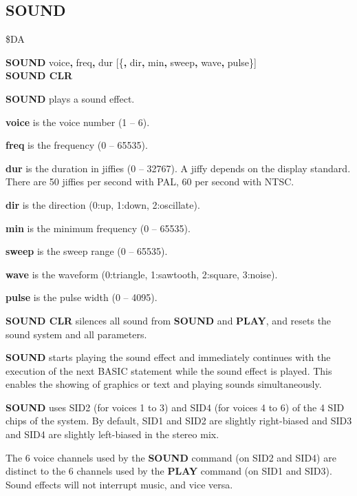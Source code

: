\subsection{SOUND}
\begin{description}[leftmargin=2cm,style=nextline]
\item [Token:]    \$DA

\item [Format:]   {\bf SOUND} voice{\bf,} freq{\bf,} dur [\{{\bf,} dir{\bf,} min{\bf,} sweep{\bf,} wave{\bf,} pulse\}] \\
                  {\bf SOUND CLR}

\item [Usage:]    {\bf SOUND} plays a sound effect.

                  {\bf voice} is the voice number (1 -- 6).

                  {\bf freq} is the frequency (0 -- 65535).

                  {\bf dur} is the duration in jiffies (0 -- 32767). A jiffy depends on the display standard. There are 50 jiffies per second with PAL, 60 per second with NTSC.

                  {\bf dir} is the direction (0:up, 1:down, 2:oscillate).

                  {\bf min} is the minimum frequency (0 -- 65535).

                  {\bf sweep} is the sweep range (0 -- 65535).

                  {\bf wave} is the waveform (0:triangle, 1:sawtooth, 2:square, 3:noise).

                  {\bf pulse} is the pulse width (0 -- 4095).

                  {\bf SOUND CLR} silences all sound from {\bf SOUND} and {\bf PLAY}, and resets the sound system and all parameters.

\item [Remarks:]  {\bf SOUND} starts playing the sound effect and immediately continues with the execution of the next BASIC statement while the sound effect is played. This enables the showing of graphics or text and playing sounds simultaneously.

                  {\bf SOUND} uses SID2 (for voices 1 to 3) and SID4 (for voices 4 to 6) of the 4 SID chips of the system. By default, SID1 and SID2 are slightly right-biased and SID3 and SID4 are slightly left-biased in the stereo mix.

                  The 6 voice channels used by the {\bf SOUND} command (on SID2 and SID4) are distinct to the 6 channels used by the {\bf PLAY} command (on SID1 and SID3). Sound effects will not interrupt music, and vice versa.


\end{description}
